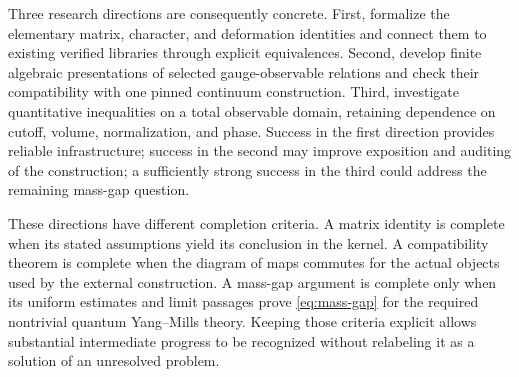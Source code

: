 Three research directions are consequently concrete.  First, formalize the
elementary matrix, character, and deformation identities and connect them
to existing verified libraries through explicit equivalences.  Second,
develop finite algebraic presentations of selected gauge-observable
relations and check their compatibility with one pinned continuum
construction.  Third, investigate quantitative inequalities on a total
observable domain, retaining dependence on cutoff, volume, normalization,
and phase.  Success in the first direction provides reliable infrastructure;
success in the second may improve exposition and auditing of the
construction; a sufficiently strong success in the third could address the
remaining mass-gap question.

These directions have different completion criteria.  A matrix identity
is complete when its stated assumptions yield its conclusion in the
kernel.  A compatibility theorem is complete when the diagram of maps
commutes for the actual objects used by the external construction.
A mass-gap argument is complete only when its uniform estimates and
limit passages prove \eqref{eq:mass-gap} for the required nontrivial
quantum Yang--Mills theory.  Keeping those criteria explicit allows
substantial intermediate progress to be recognized without relabeling
it as a solution of an unresolved problem.
